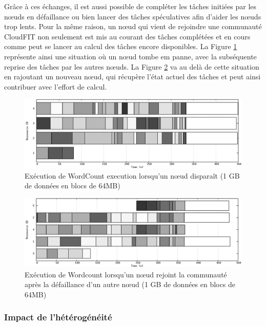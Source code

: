 Grâce à ces échanges, il est aussi possible de compléter les tâches initiées par les n{\oe}uds en défaillance ou bien lancer des tâches spéculatives afin d'aider les n{\oe}uds trop lents. Pour la même raison, un n{\oe}ud qui vient de rejoindre une communauté CloudFIT non seulement est mis au courant des tâches complétées et en cours comme peut se lancer au calcul des tâches encore disponibles. La Figure \ref{fig:1out} représente ainsi une situation où un n{\oe}ud tombe em panne, avec la subséquente reprise des tâches par les autres n{\oe}uds. La Figure \ref{fig:reprise} va au delà de cette situation en rajoutant un nouveau n{\oe}ud, qui récupère l'état actuel des tâches et peut ainsi contribuer avec l'effort de calcul.
\begin{figure}
	\begin{center}
		\includegraphics[width=1\linewidth]{img/1out2}
		\caption{Exécution de WordCount execution lorsqu'un n{\oe}ud disparaît (1 GB de données en blocs de 64MB)}\label{fig:1out}
	\end{center}
\end{figure}

\begin{figure}
	\begin{center}
		\includegraphics[width=1\linewidth]{img/reprise2}
		\caption{Exécution de Wordcount lorsqu'un n{\oe}ud rejoint la communauté après la défaillance d'un autre n{\oe}ud (1 GB de données en blocs de 64MB)}\label{fig:reprise}
	\end{center}
\end{figure}


\subsubsection{Impact de l'hétérogénéité}

